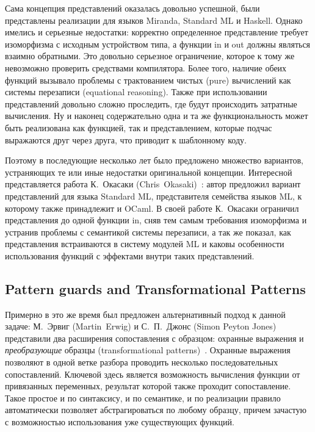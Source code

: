 Сама концепция представлений оказалась довольно успешной, были представлены реализации для языков Miranda, Standard ML и Haskell. Однако имелись и серьезные недостатки: корректно определенное представление требует изоморфизма с исходным устройством типа, а функции in и out должны являться взаимно обратными. Это довольно серьезное ограничение, которое к тому же невозможно проверить средствами компилятора. Более того, наличие обеих функций вызывало проблемы с трактованием чистых (pure) вычислений как системы перезаписи (equational reasoning). Также при использовании представлений довольно сложно проследить, где будут происходить затратные вычисления. Ну и наконец содержательно одна и та же функциональность может быть реализована как функцией, так и представлением, которые подчас выражаются друг через друга, что приводит к шаблонному коду.

Поэтому в последующие несколько лет было предложено множество вариантов, устраняющих те или иные недостатки оригинальной концепции. Интересной представляется работа К.~Окасаки (Chris~Okasaki)~\cite{okasaki98views}: автор предложил вариант представлений для языка Standard ML, представителя семейства языков ML, к которому также принадлежит и OCaml. В своей работе К.~Окасаки ограничил представления до одной функции in, сняв тем самым требования изоморфизма и устранив проблемы с семантикой системы перезаписи, а так же показал, как представления встраиваются в систему модулей ML и каковы особенности использования функций с эффектами внутри таких представлений.

\subsection{Pattern guards and Transformational Patterns} \label{sec:pattern_guards}
Примерно в это же время был предложен альтернативный подход к данной задаче: М.~Эрвиг (Martin~Erwig) и С.~П.~Джонс (Simon Peyton Jones) представили два расширения сопоставления с образцом: охранные выражения и \textit{преобразующие} образцы (transformational patterns)~\cite{erwig2000pattern}. Охранные выражения позволяют в одной ветке разбора проводить нес\-колько последовательных сопоставлений. Ключевой здесь является возможность вычисления функции от привязанных переменных, результат которой также проходит сопоставление.  Такое простое и по синтаксису, и по семантике, и по реализации правило автоматически позволяет абстрагироваться по любому образцу, причем зачастую с возможностью использования уже существующих функций. 

